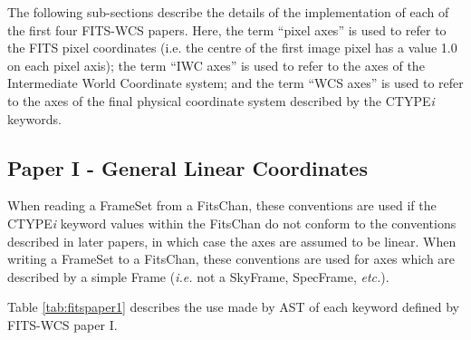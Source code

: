 \documentclass[twoside,11pt]{article}
\begin{document}
The following sub-sections describe the details of the implementation of
each of the first four FITS-WCS papers. Here, the term ``pixel axes'' is
used to refer to the FITS pixel coordinates (i.e. the centre of the
first image pixel has a value 1.0 on each pixel axis); the term ``IWC
axes'' is used to refer to the axes of the Intermediate World Coordinate
system; and the term ``WCS axes'' is used to refer to the axes of the final
physical coordinate system described by the CTYPE\emph{i} keywords.

\subsection{Paper I - General Linear Coordinates}
When reading a FrameSet from a FitsChan, these conventions are used if the CTYPE\emph{i} keyword
values within the FitsChan do not conform to the conventions described in
later papers, in which case the axes are assumed to be linear. When
writing a FrameSet to a FitsChan, these conventions are used for axes
which are described by a simple Frame (\emph{i.e.} not a
SkyFrame, SpecFrame, \emph{etc.}).

Table \ref{tab:fitspaper1} describes the use made by AST of each keyword
defined by FITS-WCS paper I.
\end{document}
